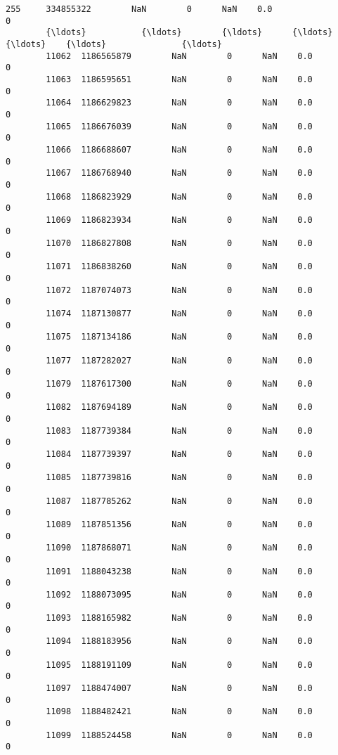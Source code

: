 \documentclass[11pt]{article}
\begin{document}
\begin{Verbatim}[commandchars=\\\{\}]
        255     334855322        NaN        0      NaN    0.0                 0   
        {\ldots}           {\ldots}        {\ldots}      {\ldots}      {\ldots}    {\ldots}               {\ldots}   
        11062  1186565879        NaN        0      NaN    0.0                 0   
        11063  1186595651        NaN        0      NaN    0.0                 0   
        11064  1186629823        NaN        0      NaN    0.0                 0   
        11065  1186676039        NaN        0      NaN    0.0                 0   
        11066  1186688607        NaN        0      NaN    0.0                 0   
        11067  1186768940        NaN        0      NaN    0.0                 0   
        11068  1186823929        NaN        0      NaN    0.0                 0   
        11069  1186823934        NaN        0      NaN    0.0                 0   
        11070  1186827808        NaN        0      NaN    0.0                 0   
        11071  1186838260        NaN        0      NaN    0.0                 0   
        11072  1187074073        NaN        0      NaN    0.0                 0   
        11074  1187130877        NaN        0      NaN    0.0                 0   
        11075  1187134186        NaN        0      NaN    0.0                 0   
        11077  1187282027        NaN        0      NaN    0.0                 0   
        11079  1187617300        NaN        0      NaN    0.0                 0   
        11082  1187694189        NaN        0      NaN    0.0                 0   
        11083  1187739384        NaN        0      NaN    0.0                 0   
        11084  1187739397        NaN        0      NaN    0.0                 0   
        11085  1187739816        NaN        0      NaN    0.0                 0   
        11087  1187785262        NaN        0      NaN    0.0                 0   
        11089  1187851356        NaN        0      NaN    0.0                 0   
        11090  1187868071        NaN        0      NaN    0.0                 0   
        11091  1188043238        NaN        0      NaN    0.0                 0   
        11092  1188073095        NaN        0      NaN    0.0                 0   
        11093  1188165982        NaN        0      NaN    0.0                 0   
        11094  1188183956        NaN        0      NaN    0.0                 0   
        11095  1188191109        NaN        0      NaN    0.0                 0   
        11097  1188474007        NaN        0      NaN    0.0                 0   
        11098  1188482421        NaN        0      NaN    0.0                 0   
        11099  1188524458        NaN        0      NaN    0.0                 0   
        

\end{Verbatim}
\end{document}
